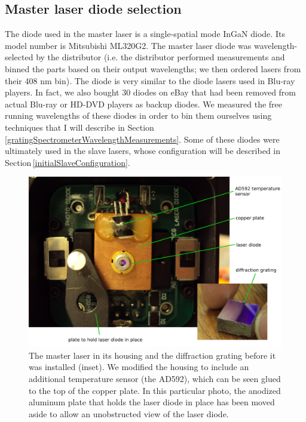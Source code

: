 \subsection{Master laser diode selection}
\label{masterLaserDiodes}
The diode used in the master laser is a single-spatial mode InGaN diode. Its model number is Mitsubishi ML320G2. The master laser diode was wavelength-selected by the distributor (i.e. the distributor performed measurements and binned the parts based on their output wavelengths; we then ordered lasers from their 408 nm bin). The diode is very similar to the diode lasers used in Blu-ray players. 
In fact, we also bought 30 diodes on eBay that had been removed from actual Blu-ray or HD-DVD players as backup diodes. We measured the free running wavelengths of these diodes in order to bin them ourselves using techniques that I will describe in Section\,\ref{gratingSpectrometerWavelengthMeasurements}. Some of these diodes were ultimately used in the slave lasers, whose configuration will be described in Section\,\ref{initialSlaveConfiguration}.

\begin{figure}
\centering
\includegraphics[width=1\textwidth]{laser_on_in_housing.JPG}
\caption[Photographs of master laser components]{The master laser in its housing and the diffraction grating before it was installed (inset). We modified the housing to include an additional temperature sensor (the AD592), which can be seen glued to the top of the copper plate. In this particular photo, the anodized aluminum plate that holds the laser diode in place has been moved aside to allow an unobstructed view of the laser diode.\label{master_laser_interior_photo}
}
\end{figure}

